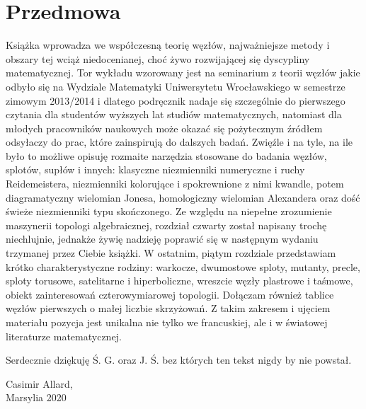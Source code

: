 \chapter*{Przedmowa}
Książka wprowadza we współczesną teorię węzłów, najważniejsze metody i obszary tej wciąż niedocenianej, choć żywo rozwijającej się dyscypliny matematycznej.
Tor wykładu wzorowany jest na seminarium z teorii węzłów jakie odbyło się na Wydziale Matematyki Uniwersytetu Wrocławskiego w semestrze zimowym 2013/2014 i dlatego podręcznik nadaje się szczególnie do pierwszego czytania dla studentów wyższych lat studiów matematycznych, natomiast dla młodych pracowników naukowych może okazać się pożytecznym źródłem odsyłaczy do prac, które zainspirują do dalszych badań.
Zwięźle i na tyle, na ile było to możliwe opisuję rozmaite narzędzia stosowane do badania węzłów, splotów, supłów i innych: klasyczne niezmienniki numeryczne i ruchy Reidemeistera, niezmienniki kolorujące i spokrewnione z nimi kwandle, potem diagramatyczny wielomian Jonesa, homologiczny wielomian Alexandera oraz dość świeże niezmienniki typu skończonego.
Ze względu na niepełne zrozumienie maszynerii topologi algebraicznej, rozdział czwarty został napisany trochę niechlujnie, jednakże żywię nadzieję poprawić się w następnym wydaniu trzymanej przez Ciebie książki.
W ostatnim, piątym rozdziale przedstawiam krótko charakterystyczne rodziny: warkocze, dwumostowe sploty, mutanty, precle, sploty torusowe, satelitarne i hiperboliczne, wreszcie węzły plastrowe i taśmowe, obiekt zainteresowań czterowymiarowej topologii.
Dołączam również tablice węzłów pierwszych o małej liczbie skrzyżowań.
Z takim zakresem i ujęciem materiału pozycja jest unikalna nie tylko we francuskiej, ale i w światowej literaturze matematycznej.

Serdecznie dziękuję Ś. G. oraz J. Ś. bez których ten tekst nigdy by nie powstał.\\${}$

\begin{flushright}
Casimir Allard,\\Marsylia 2020
\end{flushright}

\tableofcontents
